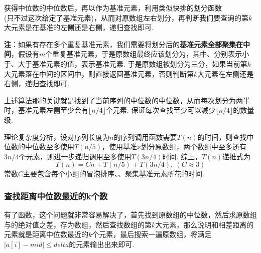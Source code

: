 \documentclass[12pt, a4paper, oneside]{ctexart}
\numberwithin{equation}{section}  %
\let\leq=\leqslant %
\begin{document}
获得中位数的中位数后，再以作为基准元素，利用类似快排的划分函数\\(只不过这次给定了基准元素)，从而对原数组左右划分，再判断我们要查询的第$k$大元素是在基准的左侧还是右侧，递归查找即可.

\textbf{注}：如果有存在多个重复基准元素，我们需要将划分后的\textbf{基准元素全部聚集在中间}，假设有$m$个重复基准元素，于是原数组最终应该划分为\cppinline{[00000|$$$$|11111]}，其中、分别表示小于、大于基准元素的值，\cppinline{$}表示基准元素. 于是原数组被划分为三分，如果当前第$k$大元素落在中间的区间中，则直接返回基准元素，否则判断第$k$大元素在左侧还是右侧，递归查找即可.

上述算法那的关键就是找到了当前序列的中位数的中位数，从而每次划分为两半时，基准元素左侧至少会有$\lfloor n/4\rfloor$个元素. 保证每次查找至少可以减少$\lfloor n/4\rfloor$的数量级.

理论复杂度分析，设对序列长度为$n$的序列调用函数需要$T(n)$的时间，则查找中位数的中位数至多使用$T(n/5)$，使用基准$x$划分原数组，两个数组中至多还有$3n/4$个元素，则进一步递归调用至多使用$T(3n/4)$时间. 综上，$T(n)$递推式为
\begin{equation*}
    T(n) = Cn+T(n/5)+T(3n/4),\ (C\approx 3)
\end{equation*}
常数$C$主要包含每个小组的冒泡排序、、聚集基准元素所花的时间.
\subsubsection{查找距离中位数最近的k个数}
有了函数，这个问题就非常容易解决了，首先找到原数组的中位数，然后求原数组与的绝对值之差，存为数组，然后查找数组的第$k$大元素，那么说明和相差距离的元素就是距离中位数最近的$k$个元素，最后搜索一遍原数组，将满足$|a[i] - mid|\leq delta$的元素输出出来即可.
\end{document}
